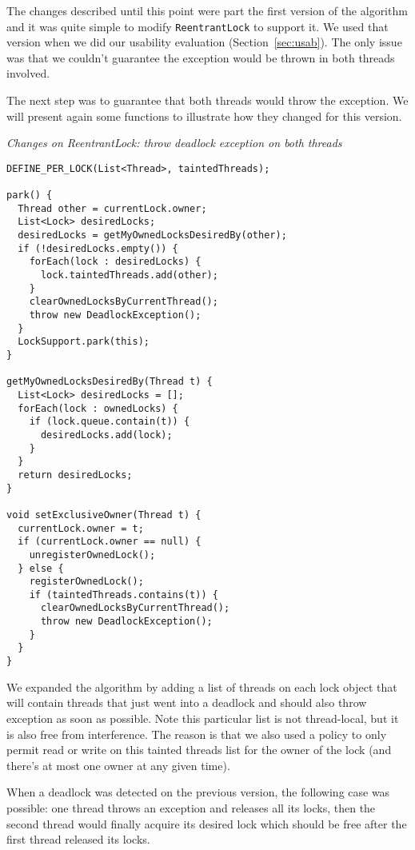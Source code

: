 The changes described until this point were part the first version of the algorithm and it was quite simple to modify {\tt ReentrantLock} to support it.
We used that version when we did our usability evaluation (Section~\ref{sec:usab}).
The only issue was that we couldn't guarantee the exception would be thrown in both threads involved.

The next step was to guarantee that both threads would throw the exception.
We will present again some functions to illustrate how they changed for this version.

\medskip
\noindent
{\it Changes on ReentrantLock: throw deadlock exception on both threads}
\begin{verbatim}
DEFINE_PER_LOCK(List<Thread>, taintedThreads);

park() {
  Thread other = currentLock.owner;
  List<Lock> desiredLocks;
  desiredLocks = getMyOwnedLocksDesiredBy(other);
  if (!desiredLocks.empty()) {
    forEach(lock : desiredLocks) {
      lock.taintedThreads.add(other);
    }
    clearOwnedLocksByCurrentThread();
    throw new DeadlockException();
  }
  LockSupport.park(this);
}

getMyOwnedLocksDesiredBy(Thread t) {
  List<Lock> desiredLocks = [];
  forEach(lock : ownedLocks) {
    if (lock.queue.contain(t)) {
      desiredLocks.add(lock);
    }
  }
  return desiredLocks;
}

void setExclusiveOwner(Thread t) {
  currentLock.owner = t;
  if (currentLock.owner == null) {
    unregisterOwnedLock();
  } else {
    registerOwnedLock();
    if (taintedThreads.contains(t)) {
      clearOwnedLocksByCurrentThread();
      throw new DeadlockException();
    }
  }
}

\end{verbatim}

We expanded the algorithm by adding a list of threads on each lock object that will contain threads that just went into a deadlock and should also throw exception as soon as possible. Note this particular list is not thread-local, but it is also free from interference. The reason is that we also used a policy to only permit read or write on this tainted threads list for the owner of the lock (and there's at most one owner at any given time).

When a deadlock was detected on the previous version, the following case was possible:
one thread throws an exception and releases all its locks,
then the second thread would finally acquire its desired lock
which should be free after the first thread released its locks.


